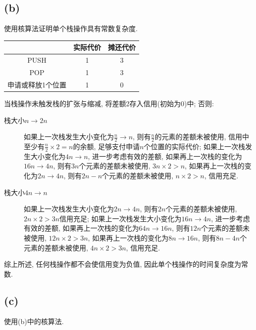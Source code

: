 \documentclass{article}
\begin{document}
\subsection{(b)}

使用核算法证明单个栈操作具有常数复杂度.

\begin{table}[H]
    \centering
    \begin{tabular}{ccc}
    \hline
     & 实际代价 & 摊还代价 \\ \hline
    PUSH & 1 & 3 \\
    POP & 1 & 3 \\
    申请或释放1个位置 & 1 & 0 \\ \hline
    \end{tabular}
    \end{table}

当栈操作未触发栈的扩张与缩减, 将差额2存入信用(初始为0)中; 否则:

\begin{description}
    \item[栈大小$n \rightarrow 2n$] 如果上一次栈发生大小变化为$\frac{n}{2} \rightarrow n$, 则有$\frac{n}{2}$的元素的差额未被使用, 信用中至少有$\frac{n}{2} \times 2 = n$的余额, 足够支付申请$n$个位置的实际代价; 如果上一次栈发生大小变化为$4n \rightarrow n$, 进一步考虑有效的差额, 如果再上一次栈的变化为$16n \rightarrow 4n$, 则有$3n$个元素的差额未被使用, $3n \times 2 > n$, 如果再上一次栈的变化为$2n \rightarrow 4n$, 则有$2n-n$个元素的差额未被使用, $n\times 2 > n$, 信用充足.
    \item[栈大小$4n \rightarrow n$] 如果上一次栈发生大小变化为$2n \rightarrow 4n$, 则有$2n$个元素的差额未被使用, $2n \times 2 > 3n$信用充足; 如果上一次栈发生大小变化为$16n \rightarrow 4n$, 进一步考虑有效的差额, 如果再上一次栈的变化为$64n \rightarrow 16n$, 则有$12n$个元素的差额未被使用, $12n \times 2 > 3n$, 如果再上一次栈的变化为$8n \rightarrow 16n$, 则有$8n-4n$个元素的差额未被使用, $4n\times 2 > 3n$, 信用充足.
\end{description}

综上所述, 任何栈操作都不会使信用变为负值, 因此单个栈操作的时间复杂度为常数.

\subsection{(c)}

使用(b)中的核算法.
\end{document}
